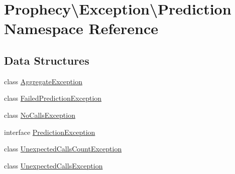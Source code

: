 \hypertarget{namespace_prophecy_1_1_exception_1_1_prediction}{}\section{Prophecy\textbackslash{}Exception\textbackslash{}Prediction Namespace Reference}
\label{namespace_prophecy_1_1_exception_1_1_prediction}
\subsection*{Data Structures}
\begin{DoxyCompactItemize}
\item 
class \mbox{\hyperlink{class_prophecy_1_1_exception_1_1_prediction_1_1_aggregate_exception}{Aggregate\+Exception}}
\item 
class \mbox{\hyperlink{class_prophecy_1_1_exception_1_1_prediction_1_1_failed_prediction_exception}{Failed\+Prediction\+Exception}}
\item 
class \mbox{\hyperlink{class_prophecy_1_1_exception_1_1_prediction_1_1_no_calls_exception}{No\+Calls\+Exception}}
\item 
interface \mbox{\hyperlink{interface_prophecy_1_1_exception_1_1_prediction_1_1_prediction_exception}{Prediction\+Exception}}
\item 
class \mbox{\hyperlink{class_prophecy_1_1_exception_1_1_prediction_1_1_unexpected_calls_count_exception}{Unexpected\+Calls\+Count\+Exception}}
\item 
class \mbox{\hyperlink{class_prophecy_1_1_exception_1_1_prediction_1_1_unexpected_calls_exception}{Unexpected\+Calls\+Exception}}
\end{DoxyCompactItemize}
